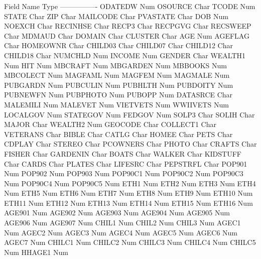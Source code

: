 \documentclass[
  11pt,
  a4paper,
  DIV=12,captions=tableheading,oneside,titlepage]{scrbook}
\let\oldverbatim\verbatim
\let\endoldverbatim\endverbatim
\renewenvironment{verbatim}{\footnotesize\oldverbatim}{\endoldverbatim}
\begin{document}
\begin{verbatim}
  Field Name  Type  
  ----------------
  ODATEDW     Num   
  OSOURCE     Char  
  TCODE       Num   
  STATE       Char  
  ZIP         Char  
  MAILCODE    Char  
  PVASTATE    Char  
  DOB         Num   
  NOEXCH      Char  
  RECINHSE    Char  
  RECP3       Char  
  RECPGVG     Char  
  RECSWEEP    Char  
  MDMAUD      Char  
  DOMAIN      Char  
  CLUSTER     Char  
  AGE         Num   
  AGEFLAG     Char  
  HOMEOWNR    Char  
  CHILD03     Char  
  CHILD07     Char  
  CHILD12     Char  
  CHILD18     Char  
  NUMCHLD     Num   
  INCOME      Num   
  GENDER      Char  
  WEALTH1     Num   
  HIT         Num   
  MBCRAFT     Num   
  MBGARDEN    Num   
  MBBOOKS     Num   
  MBCOLECT    Num   
  MAGFAML     Num   
  MAGFEM      Num   
  MAGMALE     Num   
  PUBGARDN    Num   
  PUBCULIN    Num   
  PUBHLTH     Num   
  PUBDOITY    Num   
  PUBNEWFN    Num   
  PUBPHOTO    Num   
  PUBOPP      Num   
  DATASRCE    Char  
  MALEMILI    Num   
  MALEVET     Num   
  VIETVETS    Num   
  WWIIVETS    Num   
  LOCALGOV    Num   
  STATEGOV    Num   
  FEDGOV      Num   
  SOLP3       Char  
  SOLIH       Char  
  MAJOR       Char  
  WEALTH2     Num   
  GEOCODE     Char  
  COLLECT1    Char  
  VETERANS    Char  
  BIBLE       Char  
  CATLG       Char  
  HOMEE       Char  
  PETS        Char  
  CDPLAY      Char  
  STEREO      Char  
  PCOWNERS    Char  
  PHOTO       Char  
  CRAFTS      Char  
  FISHER      Char  
  GARDENIN    Char  
  BOATS       Char  
  WALKER      Char  
  KIDSTUFF    Char  
  CARDS       Char  
  PLATES      Char  
  LIFESRC     Char  
  PEPSTRFL    Char  
  POP901      Num   
  POP902      Num   
  POP903      Num   
  POP90C1     Num   
  POP90C2     Num   
  POP90C3     Num   
  POP90C4     Num   
  POP90C5     Num   
  ETH1        Num   
  ETH2        Num   
  ETH3        Num   
  ETH4        Num   
  ETH5        Num   
  ETH6        Num   
  ETH7        Num   
  ETH8        Num   
  ETH9        Num   
  ETH10       Num   
  ETH11       Num   
  ETH12       Num   
  ETH13       Num   
  ETH14       Num   
  ETH15       Num   
  ETH16       Num   
  AGE901      Num   
  AGE902      Num   
  AGE903      Num   
  AGE904      Num   
  AGE905      Num   
  AGE906      Num   
  AGE907      Num   
  CHIL1       Num   
  CHIL2       Num   
  CHIL3       Num   
  AGEC1       Num   
  AGEC2       Num   
  AGEC3       Num   
  AGEC4       Num   
  AGEC5       Num   
  AGEC6       Num   
  AGEC7       Num   
  CHILC1      Num   
  CHILC2      Num   
  CHILC3      Num   
  CHILC4      Num   
  CHILC5      Num   
  HHAGE1      Num   

\end{verbatim}
\end{document}

